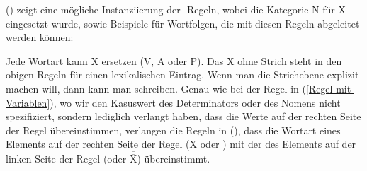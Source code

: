 () zeigt eine mögliche Instanziierung der \xbar-Regeln, wobei die Kategorie N für X eingesetzt wurde, sowie Beispiele für Wortfolgen,
die mit diesen Regeln abgeleitet werden können:
\eanoraggedright
\label{psg-xbar-schema}
\z

\noindent
Jede Wortart kann X ersetzen (\zb V, A oder P). Das X ohne Strich steht in den obigen Regeln für einen
lexikalischen Eintrag. Wenn man die Strichebene explizit machen will, dann kann man \xnull schreiben.
Genau wie bei der Regel in (\ref{Regel-mit-Variablen}), wo wir den Kasuswert des
Determinators oder des Nomens nicht spezifiziert, sondern lediglich verlangt haben, dass die Werte auf der rechten Seite der
Regel übereinstimmen, verlangen die Regeln in (), dass die Wortart eines Elements auf der rechten Seite
der Regel (X oder \xbar) mit der des Elements auf der linken Seite der Regel (\xbar oder
$\overline{\overline{\mbox{X}}}$) übereinstimmt.

